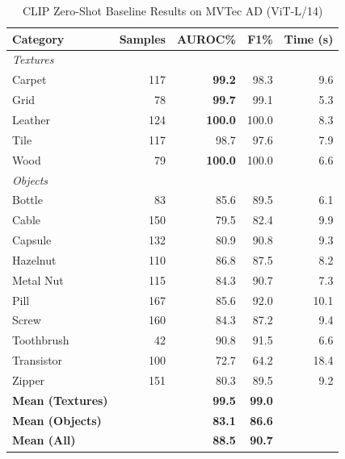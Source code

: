 \begin{table}[h]
\centering
\caption{CLIP Zero-Shot Baseline Results on MVTec AD (ViT-L/14)}
\label{tab:mvtec_results}
\renewcommand{\arraystretch}{1.15}
\small
\begin{tabular}{@{} l r r r r @{}}
\toprule
\textbf{Category} & \textbf{Samples} & \textbf{AUROC\%} & \textbf{F1\%} & \textbf{Time (s)} \\
\midrule
\multicolumn{5}{l}{\textit{Textures}} \\
\midrule
Carpet & 117 & \textbf{99.2} & 98.3 & 9.6 \\
Grid & 78 & \textbf{99.7} & 99.1 & 5.3 \\
Leather & 124 & \textbf{100.0} & 100.0 & 8.3 \\
Tile & 117 & 98.7 & 97.6 & 7.9 \\
Wood & 79 & \textbf{100.0} & 100.0 & 6.6 \\
\midrule
\multicolumn{5}{l}{\textit{Objects}} \\
\midrule
Bottle & 83 & 85.6 & 89.5 & 6.1 \\
Cable & 150 & 79.5 & 82.4 & 9.9 \\
Capsule & 132 & 80.9 & 90.8 & 9.3 \\
Hazelnut & 110 & 86.8 & 87.5 & 8.2 \\
Metal Nut & 115 & 84.3 & 90.7 & 7.3 \\
Pill & 167 & 85.6 & 92.0 & 10.1 \\
Screw & 160 & 84.3 & 87.2 & 9.4 \\
Toothbrush & 42 & 90.8 & 91.5 & 6.6 \\
Transistor & 100 & 72.7 & 64.2 & 18.4 \\
Zipper & 151 & 80.3 & 89.5 & 9.2 \\
\midrule
\textbf{Mean (Textures)} & & \textbf{99.5} & \textbf{99.0} & \\
\textbf{Mean (Objects)} & & \textbf{83.1} & \textbf{86.6} & \\
\textbf{Mean (All)} & & \textbf{88.5} & \textbf{90.7} & \\
\bottomrule
\end{tabular}
\end{table}

